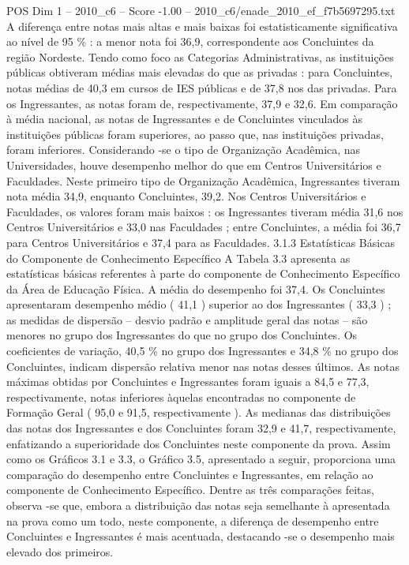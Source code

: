 \begin{textsample}{POS Dim 1 – 2010\_c6 – Score -1.00 – 2010\_c6/enade\_2010\_ef\_f7b5697295.txt}
A diferença entre notas mais altas e mais baixas foi estatisticamente significativa ao nível de 95 \% : a menor nota foi 36,9, correspondente aos Concluintes da região Nordeste.
Tendo como foco as Categorias Administrativas, as instituições públicas obtiveram médias mais elevadas do que as privadas : para Concluintes, notas médias de 40,3 em cursos de IES públicas e de 37,8 nos das privadas.
Para os Ingressantes, as notas foram de, respectivamente, 37,9 e 32,6.
Em comparação à média nacional, as notas de Ingressantes e de Concluintes vinculados às instituições públicas foram superiores, ao passo que, nas instituições privadas, foram inferiores.
Considerando -se o tipo de Organização Acadêmica, nas Universidades, houve desempenho melhor do que em Centros Universitários e Faculdades.
Neste primeiro tipo de Organização Acadêmica, Ingressantes tiveram nota média 34,9, enquanto Concluintes, 39,2.
Nos Centros Universitários e Faculdades, os valores foram mais baixos : os Ingressantes tiveram média 31,6 nos Centros Universitários e 33,0 nas Faculdades ; entre Concluintes, a média foi 36,7 para Centros Universitários e 37,4 para as Faculdades. 3.1.3 Estatísticas Básicas do Componente de Conhecimento Específico A Tabela 3.3 apresenta as estatísticas básicas referentes à parte do componente de Conhecimento Específico da Área de Educação Física.
A média do desempenho foi 37,4.
Os Concluintes apresentaram desempenho médio ( 41,1 ) superior ao dos Ingressantes ( 33,3 ) ; as medidas de dispersão – desvio padrão e amplitude geral das notas – são menores no grupo dos Ingressantes do que no grupo dos Concluintes.
Os coeficientes de variação, 40,5 \% no grupo dos Ingressantes e 34,8 \% no grupo dos Concluintes, indicam dispersão relativa menor nas notas desses últimos.
As notas máximas obtidas por Concluintes e Ingressantes foram iguais a 84,5 e 77,3, respectivamente, notas inferiores àquelas encontradas no componente de Formação Geral ( 95,0 e 91,5, respectivamente ).
As medianas das distribuições das notas dos Ingressantes e dos Concluintes foram 32,9 e 41,7, respectivamente, enfatizando a superioridade dos Concluintes neste componente da prova.
Assim como os Gráficos 3.1 e 3.3, o Gráfico 3.5, apresentado a seguir, proporciona uma comparação do desempenho entre Concluintes e Ingressantes, em relação ao componente de Conhecimento Específico.
Dentre as três comparações feitas, observa -se que, embora a distribuição das notas seja semelhante à apresentada na prova como um todo, neste componente, a diferença de desempenho entre Concluintes e Ingressantes é mais acentuada, destacando -se o desempenho mais elevado dos primeiros.

\end{textsample}
